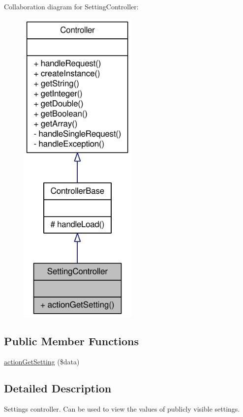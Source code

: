 Collaboration diagram for SettingController:\nopagebreak
\begin{figure}[H]
\begin{center}
\leavevmode
\includegraphics[width=164pt]{classSettingController__coll__graph}
\end{center}
\end{figure}
\subsection*{Public Member Functions}
\begin{DoxyCompactItemize}
\item 
\hyperlink{classSettingController_aa1a19cc6fa6b666b11e62bc8bf4301c7}{actionGetSetting} (\$data)
\end{DoxyCompactItemize}


\subsection{Detailed Description}
Settings controller. Can be used to view the values of publicly visible settings. 

